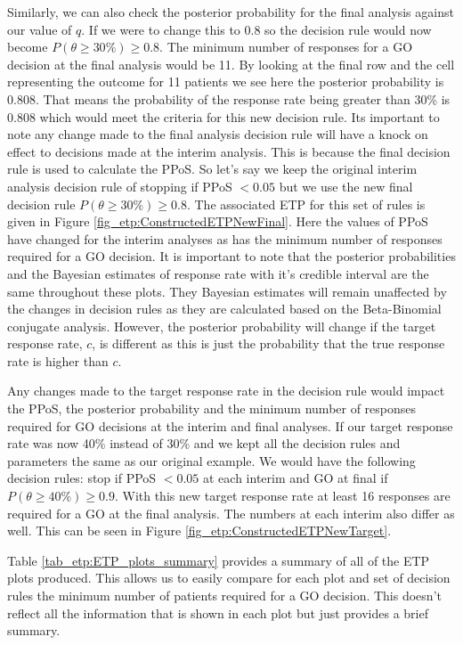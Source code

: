 Similarly, we can also check the posterior probability for the final analysis against our value of $q$. If we were to change this to 0.8 so the decision rule would now become $P(\theta  \geq 30\%) \geq 0.8$. The minimum number of responses for a GO decision at the final analysis would be 11. By looking at the final row and the cell representing the outcome for 11 patients we see here the posterior probability is 0.808. That means the probability of the response rate being greater than 30\% is 0.808 which would meet the criteria for this new decision rule. Its important to note any change made to the final analysis decision rule will have a knock on effect to decisions made at the interim analysis. This is because the final decision rule is used to calculate the PPoS. So let's say we keep the original interim analysis decision rule of stopping if PPoS $< 0.05$ but we use the new final decision rule $P(\theta  \geq 30\%) \geq 0.8$. The associated ETP for this set of rules is given in Figure 
\ref{fig_etp:ConstructedETPNewFinal}. Here the values of PPoS have changed for the interim analyses as has the minimum number of responses required for a GO decision. It is important to note that the posterior probabilities and the Bayesian estimates of response rate with it's credible interval are the same throughout these plots. They Bayesian estimates will remain unaffected by the changes in decision rules as they are calculated based on the Beta-Binomial conjugate analysis. However, the posterior probability will change if the target response rate, $c$, is different as this is just the probability that the true response rate is higher than $c$. 

Any changes made to the target response rate in the decision rule would impact the PPoS, the posterior probability and the minimum number of responses required for GO decisions at the interim and final analyses. If our target response rate was now 40\% instead of 30\% and we kept all the decision rules and parameters the same as our original example. We would have the following decision rules: stop if PPoS $< 0.05$ at each interim and GO at final if $P(\theta  \geq 40\%) \geq 0.9$. With this new target response rate at least 16 responses are required for a GO at the final analysis. The numbers at each interim also differ as well. This can be seen in Figure \ref{fig_etp:ConstructedETPNewTarget}. 

Table \ref{tab_etp:ETP_plots_summary} provides a summary of all of the ETP plots produced. This allows us to easily compare for each plot and set of decision rules the minimum number of patients required for a GO decision. This doesn't reflect all the information that is shown in each plot but just provides a brief summary. 

